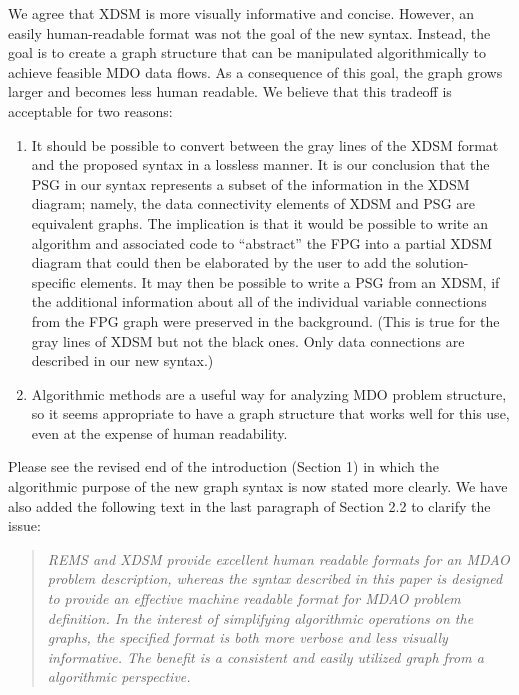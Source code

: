 \documentclass{article} %
\begin{document}

We agree that XDSM is more visually informative and concise. However, an easily human-readable format was not the
goal of the new syntax. Instead, the goal is to create a graph structure that
can be manipulated algorithmically to achieve feasible MDO data flows. As a consequence of this goal, the graph grows larger and becomes less human readable. We believe that this tradeoff is acceptable for two reasons:

\begin{enumerate}
    \item It should be possible to convert between the gray lines of the XDSM format and the proposed syntax
    in a lossless manner.
    It is our conclusion that the PSG in our syntax represents a subset of the information in the XDSM diagram; namely, the data connectivity elements of XDSM and PSG are equivalent graphs.  The implication is that it would be possible to write an algorithm and associated code to ``abstract'' the FPG into a partial XDSM diagram that could then be elaborated by the user to add the solution-specific elements.  It may then be possible to write a PSG from an XDSM, if the additional information about all of the individual variable connections from the FPG graph were preserved in the background.
    (This is true for the gray lines of XDSM but not the black ones. Only data connections are described in our new syntax.)
    \item Algorithmic methods are a useful way for analyzing MDO problem structure, so it seems appropriate to have a graph structure that works well for this use, even at the expense
    of human readability.
\end{enumerate}

Please see the revised end of the introduction (Section 1) in which the algorithmic purpose of the new graph syntax is now stated more clearly.  We have also added the following text in the last paragraph of Section 2.2 to clarify the issue:

\begin{quotation} 
\textit{REMS and XDSM provide excellent
human readable formats for an MDAO problem description, whereas the syntax described in this paper is designed to provide an effective machine readable format
for MDAO problem definition. In the interest of simplifying algorithmic operations on the graphs, the specified format is both more verbose and less visually informative. The benefit is a consistent and easily utilized
graph from a algorithmic perspective.}
\end{quotation}
\end{document}
